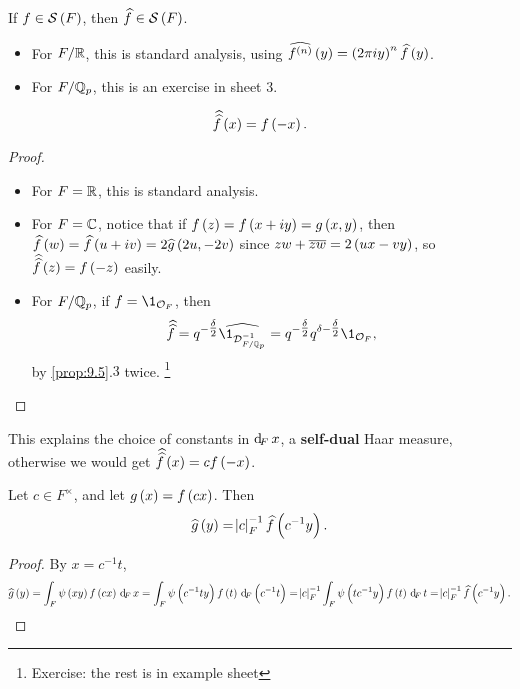 \begin{fact*}
If $ f \in \SSS\br{F} $, then $ \widehat{f} \in \SSS\br{F} $.
\begin{itemize}
\item For $ F / \mathbb{R} $, this is standard analysis, using $ \widehat{f^{\br{n}}}\br{y} = \br{2\pi iy}^n\widehat{f}\br{y} $.
\item For $ F / \mathbb{Q}_p $, this is an exercise in sheet $ 3 $.
\end{itemize}
\end{fact*}

\begin{proposition}
$$ \hathat{f}\br{x} = f\br{-x}. $$
\end{proposition}

\begin{proof}
\hfill
\begin{itemize}
\item For $ F = \mathbb{R} $, this is standard analysis.
\item For $ F = \mathbb{C} $, notice that if $ f\br{z} = f\br{x + iy} = g\br{x, y} $, then $ \widehat{f}\br{w} = \widehat{f}\br{u + iv} = 2\widehat{g}\br{2u, -2v} $ since $ zw + \overline{zw} = 2\br{ux - vy} $, so $ \hathat{f}\br{z} = f\br{-z} $ easily.
\item For $ F / \mathbb{Q}_p $, if $ f = \1_{\OOO_F} $, then
$$ \hathat{f} = q^{-\tfrac{\delta}{2}}\widehat{\1_{\DDD_{F / \QQ_p}^{-1}}} = q^{-\tfrac{\delta}{2}}q^{\delta - \tfrac{\delta}{2}}\1_{\OOO_F}, $$
by \ref{prop:9.5}.$ 3 $ twice. \footnote{Exercise: the rest is in example sheet}
\end{itemize}
\end{proof}

This explains the choice of constants in $ \dF x $, a \textbf{self-dual} Haar measure, otherwise we would get $ \hathat{f}\br{x} = cf\br{-x} $.

\pagebreak

\begin{lemma}
\label{lem:9.7}
Let $ c \in F^\times $, and let $ g\br{x} = f\br{cx} $. Then
$$ \widehat{g}\br{y} = \abs{c}_F^{-1}\widehat{f}\br{c^{-1}y}. $$
\end{lemma}

\begin{proof}
By $ x = c^{-1}t $,
$$ \widehat{g}\br{y} = \intF{\psi\br{xy}f\br{cx}}{x} = \intF{\psi\br{c^{-1}ty}f\br{t}}{\br{c^{-1}t}} = \abs{c}_F^{-1}\intF{\psi\br{tc^{-1}y}f\br{t}}{t} = \abs{c}_F^{-1}\widehat{f}\br{c^{-1}y}. $$
\end{proof}

